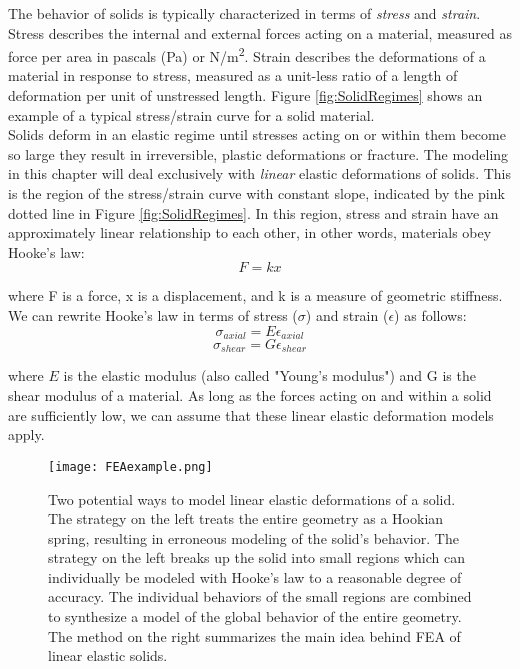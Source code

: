 {The behavior of solids is typically characterized in terms of \textit{stress} and \textit{strain}.  Stress describes the internal and external forces acting on a material, measured as force per area in pascals (Pa) or N/m\textsuperscript{2}.  Strain describes the deformations of a material in response to stress, measured as a unit-less ratio of a length of deformation per unit of unstressed length.  Figure \ref{fig:SolidRegimes} shows an example of a typical stress/strain curve for a solid material.\\

Solids deform in an elastic regime until stresses acting on or within them become so large they result in irreversible, plastic deformations or fracture.  The modeling in this chapter will deal exclusively with \textit{linear} elastic deformations of solids.  This is the region of the stress/strain curve with constant slope, indicated by the pink dotted line in Figure \ref{fig:SolidRegimes}.  In this region, stress and strain have an approximately linear relationship to each other, in other words, materials obey Hooke's law:
\[F = kx\]

where F is a force, x is a displacement, and k is a measure of geometric stiffness.  We can rewrite Hooke's law in terms of stress ($\sigma$) and strain ($\epsilon$) as follows:
\begin{equation}\label{eq:stressstrainaxial}
\sigma_{axial} = E\epsilon_{axial} 
\end{equation}
\begin{equation}\label{eq:stressstrainshear}
\sigma_{shear} = G\epsilon_{shear} 
\end{equation}

where $E$ is the elastic modulus (also called "Young's modulus") and G is the shear modulus of a material.  As long as the forces acting on and within a solid are sufficiently low, we can assume that these linear elastic deformation models apply.\\

\begin{figure}
  \texttt{[image: FEAexample.png]}
  \caption{Two potential ways to model linear elastic deformations of a solid.  The strategy on the left treats the entire geometry as a Hookian spring, resulting in erroneous modeling of the solid's behavior.  The strategy on the left breaks up the solid into small regions which can individually be modeled with Hooke's law to a reasonable degree of accuracy.  The individual behaviors of the small regions are combined to synthesize a model of the global behavior of the entire geometry.  The method on the right summarizes the main idea behind FEA of linear elastic solids.}
  \label{fig:FEAexample}
\end{figure}

}
